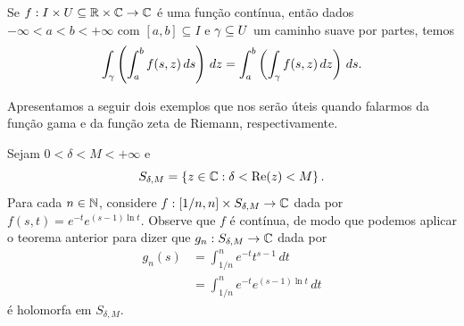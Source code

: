 %
\begin{corolario}
Se $f: I \times U \subseteq \mathbb{R} \times \mathbb{C} \to \mathbb{C}$ é uma função contínua, então
dados $-\infty < a < b < +\infty$ com $[a,b] \subseteq I$ e $\gamma\subseteq U$ um
caminho suave por partes, temos
%
\[
\int_{\gamma} \left( \int_a^b f(s,z) \, ds \right) \, dz 
= \int_a^b \left( \int_{\gamma} f(s,z) \, dz \right) \, ds.
\]
%
\end{corolario}
%
Apresentamos a seguir dois exemplos que nos serão úteis quando falarmos da
função gama e da função zeta de Riemann, respectivamente.
\begin{exemplo}
Sejam $0 < \delta < M < +\infty$ e
%
\[
S_{\delta, M} = \left\{ z\in\mathbb{C} : \delta < \mathrm{Re}(z) < M \right\}.
\]
%
Para cada $n\in\mathbb{N}$, considere $f:[1/n,n] \times S_{\delta, M} \to \mathbb{C}$ dada por
$f(s,t) = e^{-t} e^{(s-1)\ln t}$. Observe que $f$ é contínua, de modo que
podemos aplicar o teorema anterior para dizer que
$g_n:S_{\delta, M} \to \mathbb{C}$ dada por
%
\begin{align*}
    g_n(s) &= \int_{1/n}^n e^{-t}t^{s-1} \, dt \\
           &= \int_{1/n}^n e^{-t}e^{(s-1)\ln t} \, dt
\end{align*}
%
é holomorfa em $S_{\delta, M}$.
\end{exemplo}
%

